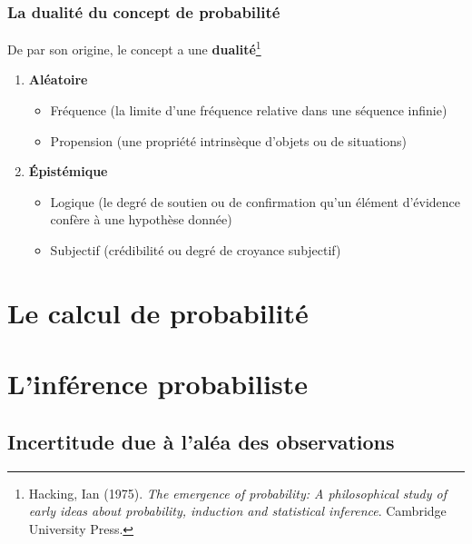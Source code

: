 \documentclass{beamer}
\begin{document}
\begin{frame}
    \frametitle{La dualité du concept de probabilité}

    De par son origine, le concept a une \textbf{dualité}\footnote{
    Hacking, Ian (1975). \emph{The emergence of probability:
    A philosophical study of early ideas about probability,
    induction and statistical inference}. Cambridge University Press.
    }

    \pause

    \vfill

    \begin{enumerate}
      \item \textbf{Aléatoire}
        \begin{itemize}
          \item Fréquence (la limite d'une fréquence relative dans une séquence infinie)
          \item Propension (une propriété intrinsèque d'objets ou de situations)
        \end{itemize}

      \pause

      \item \textbf{Épistémique}
        \begin{itemize}
          \item Logique (le degré de soutien ou de confirmation qu'un élément d'évidence confère à une hypothèse donnée)
          \item Subjectif (crédibilité ou degré de croyance subjectif)
        \end{itemize}
    \end{enumerate}
\end{frame}






\section{Le calcul de probabilité}

\section{L'inférence probabiliste}

\subsection{Incertitude due à l'aléa des observations}%
\end{document}
